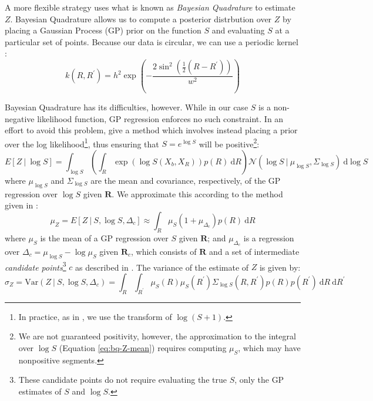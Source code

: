 \documentclass{article} %
\begin{document}
A more flexible strategy uses what is known as \emph{Bayesian
  Quadrature} \cite{Diaconis:1988uo,OHagan:1991tx} to estimate $Z$.
Bayesian Quadrature allows us to compute a posterior distrbution over
$Z$ by placing a Gaussian Process (GP) prior on the function $S$ and
evaluating $S$ at a particular set of points. Because our data is
circular, we can use a periodic kernel \cite{Rasmussen:2006vz}:
\begin{equation}
k(R, R^\prime)=h^2\exp\left(-\frac{2\sin^2\left(\frac{1}{2}(R-R^\prime)\right)}{w^2}\right)
\end{equation}

Bayesian Quadrature has its difficulties, however. While in our case
$S$ is a non-negative likelihood function, GP regression enforces no
such constraint. In an effort to avoid this problem,
\cite{Osborne:2012tm} give a method which involves instead placing a
prior over the log likelihood\footnote{In practice, as in
  \cite{Osborne:2012tm}, we use the transform of $\log(S+1)$.}, thus
ensuring that $S=e^{\log S}$ will be positive\footnote{We are not
  guaranteed positivity, however, the approximation to the integral
  over $\log S$ (Equation \ref{eq:bq-Z-mean}) requires computing
  $\mu_S$, which may have nonpositive segments.}:
\begin{equation*}
  E[Z\ \vert \ \log S]=\int_{\log S}\left(\int_R \exp(\log{S(X_b,X_R)})p(R)\ \mathrm{d}R\right)\mathcal{N}\left(\log{S}\ \vert \ \mu_{\log S}, \Sigma_{\log S}\right)\ \mathrm{d}\log S
\end{equation*}
where $\mu_{\log S}$ and $\Sigma_{\log S}$ are the mean and
covariance, respectively, of the GP regression over $\log S$ given
$\mathbf{R}$. We approximate this according to the method given in
\cite{Osborne:2012tm}:
\begin{equation}
  \mu_Z=E[Z\ \vert \ S, \log S, \Delta_c] \approx \int_R \mu_{S}(1 + \mu_{\Delta_c}) p(R)\ \mathrm{d}R 
  \label{eq:bq-Z-mean}
\end{equation}
where $\mu_S$ is the mean of a GP regression over $S$ given
$\mathbf{R}$; and $\mu_{\Delta_c}$ is a regression over
$\Delta_c=\mu_{\log S} - \log \mu_S$ given $\mathbf{R}_c$, which
consists of $\mathbf{R}$ and a set of intermediate \emph{candidate
  points}\footnote{These candidate points do not require evaluating
  the true $S$, only the GP estimates of $S$ and $\log S$.} $c$ as
described in \cite{Osborne:2012tm}. The variance of the estimate of
$Z$ is given by:
\begin{equation}
  \sigma_Z=\mathrm{Var}(Z\ \vert \ S, \log S, \Delta_c) = \int_R\int_{R^\prime} \mu_S(R)\mu_S(R^\prime) \Sigma_{\log S}(R, R^\prime)p(R)p(R^\prime)\ \mathrm{d}R\ \mathrm{d}R^\prime
  \label{eq:bq-Z-var}
\end{equation}
\end{document}
